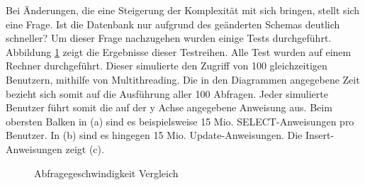 Bei Änderungen, die eine Steigerung der Komplexität mit sich bringen, stellt sich eine Frage. Ist die Datenbank nur aufgrund des geänderten Schemas deutlich schneller? Um dieser Frage nachzugehen wurden einige Tests durchgeführt. Abbildung \ref{ergebniss_vergleich} zeigt die Ergebnisse dieser Testreihen. Alle Test wurden auf einem Rechner durchgeführt. Dieser simulierte den Zugriff von 100 gleichzeitigen Benutzern, mithilfe von Multithreading. Die in den Diagrammen angegebene Zeit bezieht sich somit auf die Ausführung aller 100 Abfragen. Jeder simulierte Benutzer führt somit die auf der y Achse angegebene Anweisung aus. Beim obersten Balken in (a) sind es beispielsweise 15 Mio. SELECT-Anweisungen pro Benutzer. In (b) sind es hingegen 15 Mio. Update-Anweisungen. Die Insert-Anweisungen zeigt (c).    

\begin{figure}[htbp]
\centering
{}\hfill
{}\hfill
{}
\caption{Abfragegeschwindigkeit Vergleich}
\label{ergebniss_vergleich}
\end{figure}

